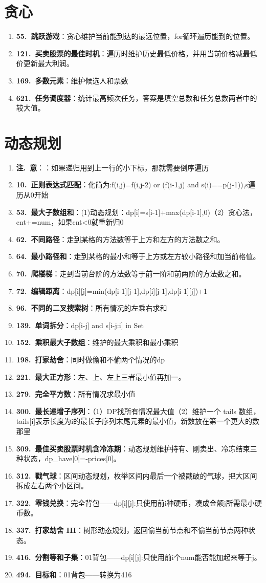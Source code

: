 \documentclass[12pt,a4paper]{ctexart}
\newcommand{\hotitem}[3]{\item \textbf{#1.~#2}：#3}
\newcommand{\hotsection}[2]{%
  \Needspace{#1\baselineskip}%
  \section*{#2}
  \begin{enumerate}[leftmargin=0pt,label={},itemsep=0.48em]
}
\newcommand{\hotend}{\end{enumerate}}
\begin{document}
\hotsection{12}{贪心}
    \hotitem{55}{跳跃游戏}{贪心维护当前能到达的最远位置，for循环遍历能到的位置。}
    \hotitem{121}{买卖股票的最佳时机}{遍历时维护历史最低价格，并用当前价格减最低价更新最大利润。}
    \hotitem{169}{多数元素}{维护候选人和票数}
    \hotitem{621}{任务调度器}{统计最高频次任务，答案是填空总数和任务总数两者中的较大值。}
\hotend

\hotsection{40}{动态规划}
    \hotitem 注意：如果递归用到上一行的小下标，那就需要倒序遍历
    \hotitem{10}{正则表达式匹配}{化简为:f(i,j)=f(i,j-2) or (f(i-1,j) and s(i)==p(j-1)),s遍历从0开始}
    \hotitem{53}{最大子数组和}{(1)动态规划：dp[i]=s[i-1]+max(dp[i-1],0)（2）贪心法，cnt+=num，如果cnt<0就重新归0}
    \hotitem{62}{不同路径}{走到某格的方法数等于上方和左方的方法数之和。}
    \hotitem{64}{最小路径和}{走到某格的最小和等于上方或左方较小路径和加当前格值。}
    \hotitem{70}{爬楼梯}{走到当前台阶的方法数等于前一阶和前两阶的方法数之和。}
    \hotitem{72}{编辑距离}{dp[i][j]=min(dp[i-1][j-1],dp[i][j-1],dp[i-1][j])+1}
    \hotitem{96}{不同的二叉搜索树}{所有情况的左乘右求和}
    \hotitem{139}{单词拆分}{dp[i-j] and s[i-j:i] in Set}
    \hotitem{152}{乘积最大子数组}{维护的最大乘积和最小乘积}
    \hotitem{198}{打家劫舍}{同时做偷和不偷两个情况的dp}
    \hotitem{221}{最大正方形}{左、上、左上三者最小值再加一。}
    \hotitem{279}{完全平方数}{所有情况求最小值}
    \hotitem{300}{最长递增子序列}{（1）DP找所有情况最大值（2）维护一个 tails 数组，tails[i]表示长度为i的最长子序列末尾元素的最小值，新数放在第一个更大的数那里}
    \hotitem{309}{最佳买卖股票时机含冷冻期}{动态规划维护持有、刚卖出、冷冻结束三种状态，dp\_have[0]=-prices[0]。}
    \hotitem{312}{戳气球}{区间动态规划，枚举区间内最后一个被戳破的气球，把大区间拆成左右两个小区间。}
    \hotitem{322}{零钱兑换}{完全背包——dp[i][j]:只使用前i种硬币，凑成金额j所需最小硬币数。}
    \hotitem{337}{打家劫舍 III}{树形动态规划，返回偷当前节点和不偷当前节点两种状态。}
    \hotitem{416}{分割等和子集}{01背包——dp[i][j]:只使用前i个num能否能加起来等于j。}
    \hotitem{494}{目标和}{01背包——转换为416}
\hotend
\end{document}
